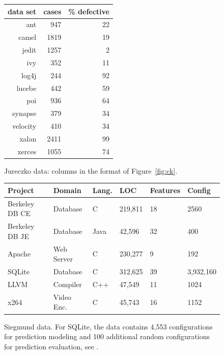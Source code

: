 \documentclass{sig-alternate}
\newcommand{\fig}[1]{Figure~\ref{fig:#1}}
\begin{document}


  
 \begin{figure}[!t]
 \small
 \begin{center}
 \begin{tabular}{r|rr}
 data set & cases & \% defective\\\hline
  ant &947& 22\\
  camel& 1819& 19\\
 jedit& 1257& 2\\
 ivy &352& 11\\
 log4j& 244 &92\\
 lucebe &442 &59\\
 poi& 936 &64\\
 synapse &379 &34\\
 velocity& 410& 34\\
 xalan& 2411& 99\\
 xerces &1055& 74
 \end{tabular}
 \end{center}
 \caption{ Jureczko data: columns in the format of \fig{ck}.}\label{fig:jd}
 \end{figure}
 
 \begin{figure}[!t]
\scriptsize
\begin{tabular}{llllll}
  \hline
  \rowcolor{lightgray}
Project & Domain & Lang. & LOC & Features & Config\\\hline
Berkeley DB CE & Database & C & 219,811 & 18 & 2560\\
Berkeley DB JE & Database & Java & 42,596 & 32  & 400\\
Apache & Web Server & C & 230,277 & 9 & 192\\
SQLite & Database & C & 312,625 & 39 & 3,932,160\\
LLVM & Compiler & C++ & 47,549 & 11 & 1024\\
x264 & Video Enc. & C& 45,743 & 16 & 1152\\\hline
\end{tabular}
 
\caption{Siegmund data.
For SQLite, the data  contains 4,553 configurations for prediction modeling and 100 additional random configurations for prediction evaluation, see \cite{vapp}.}\label{fig:cpm}
\end{figure}
\end{document}
